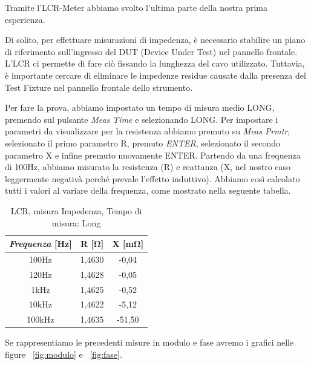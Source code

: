 Tramite l'LCR-Meter abbiamo svolto l'ultima parte della nostra prima esperienza.

Di solito, per effettuare misurazioni di impedenza, è necessario stabilire un piano di riferimento sull'ingresso del DUT (Device Under Test) nel pannello frontale. L'LCR ci permette di fare ciò fissando la lunghezza del cavo utilizzato. Tuttavia, è importante cercare di eliminare le impedenze residue causate dalla presenza del Test Fixture nel pannello frontale dello strumento.

Per fare la prova, abbiamo impostato un tempo di misura medio LONG, premendo sul pulsante \emph{Meas Time} e selezionando LONG.
Per impostare i parametri da visualizzare per la resistenza abbiamo premuto su \emph{Meas Prmtr}, selezionato il primo parametro R, premuto \emph{ENTER}, selezionato il secondo parametro X e infine premuto nuovamente ENTER.
Partendo da una frequenza di 100Hz, abbiamo misurato la resistenza (R) e reattanza (X, nel nostro caso leggermente negativà perché prevale l'effetto induttivo). Abbiamo così calcolato tutti i valori al variare della frequenza, come mostrato nella seguente tabella.  


\begin{table}[!ht]
\centering
\begin{tabular}{|c|c|c|}
\hline
\textit{\textbf{Frequenza}} \textbf{[Hz]} & \textbf{R [$\bm{\Omega}$]}  & \textbf{X [m$\bm{\Omega}$]}  \\ \hline
100Hz                       & 1,4630    & -0,04      \\ \hline
120Hz                       & 1,4628    & -0,05      \\ \hline
1kHz                        & 1,4625    & -0,52      \\ \hline
10kHz                       & 1,4622    & -5,12      \\ \hline
100kHz                      & 1,4635    & -51,50     \\ \hline
\end{tabular}
\caption{LCR, misura Impedenza, Tempo di misura: Long}
\label{tab:lcr_z}
\end{table}
\FloatBarrier


Se rappresentiamo le precedenti misure in modulo e fase avremo i grafici nelle figure ~\ref{fig:modulo} e ~\ref{fig:fase}.
%

